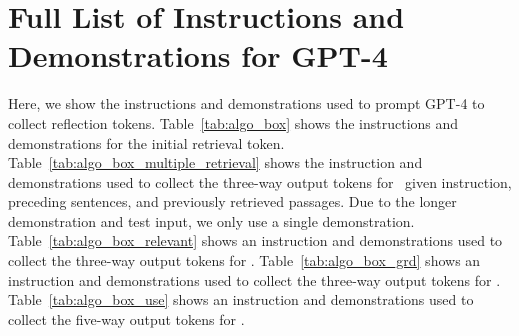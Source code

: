 \section{Full List of Instructions and Demonstrations for GPT-4}
\label{sec:instruction_gpt_4}
Here, we show the instructions and demonstrations used to prompt GPT-4 to collect reflection tokens. 
Table~\ref{tab:algo_box} shows the instructions and demonstrations for the initial retrieval token. 
Table~\ref{tab:algo_box_multiple_retrieval} shows the instruction and demonstrations used to collect the three-way output tokens for \ret~given instruction, preceding sentences, and previously retrieved passages. 
Due to the longer demonstration and test input, we only use a single demonstration. 
Table~\ref{tab:algo_box_relevant} shows an instruction and demonstrations used to collect the three-way output tokens for \crel. 
Table~\ref{tab:algo_box_grd} shows an instruction and demonstrations used to collect the three-way output tokens for \crel.
Table~\ref{tab:algo_box_use} shows an instruction and demonstrations used to collect the five-way output tokens for \cuse.
